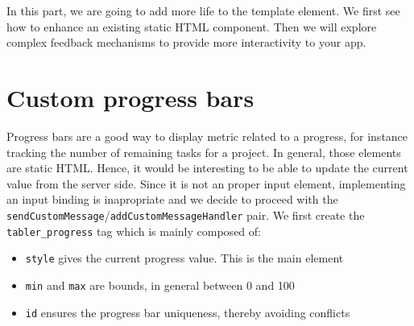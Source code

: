 \documentclass[
]{book}
\providecommand{\tightlist}{%
  \setlength{\itemsep}{0pt}\setlength{\parskip}{0pt}}
\begin{document}
In this part, we are going to add more life to the template element. We first see how to enhance an existing static HTML component. Then we will explore complex feedback mechanisms to provide more interactivity to your app.

\hypertarget{custom-progress-bars}{%
\section{Custom progress bars}\label{custom-progress-bars}}

Progress bars are a good way to display metric related to a progress, for instance tracking the number of remaining tasks for a project. In general, those elements are static HTML. Hence, it would be interesting to be able to update the current value from the server side. Since it is not an proper input element, implementing an input binding is inapropriate and we decide to proceed with the \texttt{sendCustomMessage}/\texttt{addCustomMessageHandler} pair. We first create the \texttt{tabler\_progress} tag which is mainly composed of:

\begin{itemize}
\tightlist
\item
  \texttt{style} gives the current progress value. This is the main element
\item
  \texttt{min} and \texttt{max} are bounds, in general between 0 and 100
\item
  \texttt{id} ensures the progress bar uniqueness, thereby avoiding conflicts
\end{itemize}
\end{document}
